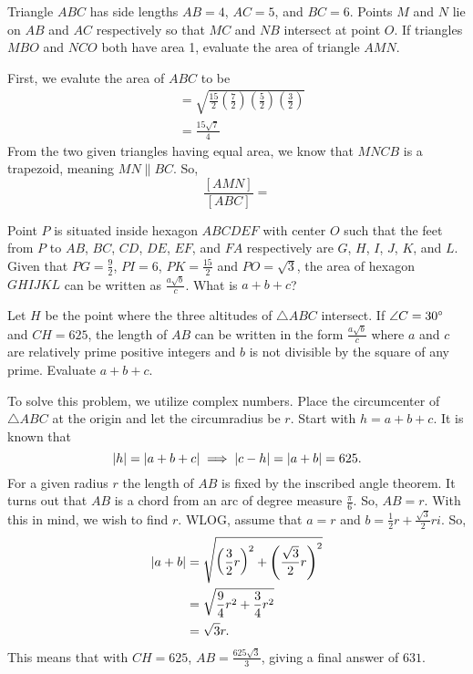 \documentclass[11pt]{scrartcl}
\begin{document}
\begin{problem}
    Triangle $ABC$ has side lengths $AB = 4$, $AC = 5$, and $BC = 6$. Points $M$ and $N$ lie on $AB$ and $AC$ respectively so that $MC$ and $NB$ intersect at point $O$. If triangles $MBO$ and $NCO$ both have area 1, evaluate the area of triangle $AMN$.
\end{problem}

\begin{soln}
    First, we evalute the area of $ABC$ to be
    \begin{align*}
        [ABC] &= \sqrt{\frac{15}{2}\left(\frac{7}{2}\right)\left(\frac{5}{2}\right)\left(\frac{3}{2}\right)} \\
        &= \frac{15\sqrt{7}}{4}
    \end{align*}
    From the two given triangles having equal area, we know that $MNCB$ is a trapezoid, meaning $MN \parallel BC$. So,
    \[\frac{[AMN]}{[ABC]} = \]
\end{soln}

\begin{problem}
    Point $P$ is situated inside hexagon $ABCDEF$ with center $O$ such that the feet from $P$ to $AB$, $BC$, $CD$, $DE$, $EF$, and $FA$ respectively are $G$, $H$, $I$, $J$, $K$, and $L$. Given that $PG = \frac{9}{2}$, $PI = 6$, $PK = \frac{15}{2}$ and $PO = \sqrt{3}$, the area of hexagon $GHIJKL$ can be written as $\frac{a\sqrt{b}}{c}$. What is $a + b + c$?
\end{problem}

\begin{soln}

\end{soln}

\begin{problem}
    Let $H$ be the point where the three altitudes of $\triangle ABC$ intersect. If $\angle C = 30^\circ$ and $CH = 625$, the length of $AB$ can be written in the form $\frac{a\sqrt{b}}{c}$ where $a$ and $c$ are relatively prime positive integers and $b$ is not divisible by the square of any prime. Evaluate $a + b + c$.
\end{problem}

\begin{soln}
    To solve this problem, we utilize complex numbers. Place the circumcenter of $\triangle ABC$ at the origin and let the circumradius be $r$. Start with $h = a + b + c$. It is known that
    \[\left\lvert h \right\rvert = \left\lvert a + b + c \right\rvert \implies \left\lvert c - h \right\rvert = \left\lvert a + b \right\rvert = 625.\]
    For a given radius $r$ the length of $AB$ is fixed by the inscribed angle theorem. It turns out that $AB$ is a chord from an arc of degree measure $\frac{\pi}{6}$. So, $AB = r$. With this in mind, we wish to find $r$. WLOG, assume that $a = r$ and $b = \frac{1}{2}r + \frac{\sqrt{3}}{2}ri$. So,
    \begin{align*}
        \left\lvert a + b \right\rvert &= \sqrt{\left(\frac{3}{2}r\right)^{2} + \left(\frac{\sqrt{3}}{2}r\right)^{2}} \\
        &= \sqrt{\frac{9}{4}r^{2} + \frac{3}{4}r^{2}} \\
        &= \sqrt{3}r.
    \end{align*}
    This means that with $CH = 625$, $AB = \frac{625\sqrt{3}}{3}$, giving a final answer of $631$.
\end{soln}
\end{document}
